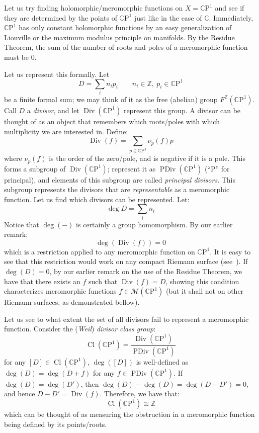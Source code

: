 \documentclass{book}
\newcommand{\Z}{{\mathbb{Z}}}
\newcommand{\C}{{\mathbb{C}}}
\newcommand{\CM}{{\mathcal{M}}}
\newcommand{\CP}{{\mathbb{C}\mathrm{P}}}
\newcommand{\Div}{{\operatorname{Div}}}
\newcommand{\PDiv}{{\operatorname{PDiv}}}
\renewcommand{\deg}{{\operatorname{deg}}}
\renewcommand{\div}{{\operatorname{Div}}}
\newcommand{\Cl}{{\operatorname{Cl}}}
\begin{document}
Let us try finding holomorphic/meromorphic functions on $X = \CP^1$ and see if they are
determined by the points of $\CP^1$ just like in the case of $\C$. Immediately, $\CP^1$ has only constant holomorphic functions by an easy
generalization of Liouville or the maximum modulus principle on manifolds. By the Residue Theorem, the sum of
the number of roots and poles of a meromorphic function must be $0$.

Let us represent this formally. Let
\[
  D = \sum_i n_ip_i \qquad n_i\in \Z,\ p_i \in \CP^1
\]
be a finite formal sum; we may think of it as the free (abelian) group $F^{\Z}(\CP^1)$. Call $D$
a \emph{divisor}, and let $\Div(\CP^1)$
represent this group. A divisor can be thought of as an object that remembers which roots/poles with which
multiplicity we are interested in. Define:
\[
  \div(f) =  \sum_{p \in \CP^1} \nu_{p}(f)p
\]
where $\nu_{p}(f)$ is the order of the zero/pole, and is negative if it is a pole. This forms a subgroup of
$\Div(\CP^1)$; represent it as $\PDiv(\CP^1)$ (``P'' for principal), and elements of this subgroup are called
\emph{principal divisors}. This subgroup represents the divisors that are \emph{representable} as a
meromorphic function. Let us find which divisors can be represented. Let:
\[
  \deg D = \sum_i n_i
\]
Notice that $\deg(-)$ is certainly a group homomorphism. By our earlier remark:
\[
  \deg(\div(f)) = 0
\]
which is a restriction applied to any meromorphic function on $\CP^1$. It is easy to see that this restriction
would work on any compact Riemann surface (see~\cite[chapter~6]{NateComplexAnalysis}). If $\deg(D) = 0$, by
our earlier remark on the use of the Residue Theorem, we have that there exists an $f$ such that $\div(f) = D$,
showing this condition characterizes meromorphic functions $f \in \CM(\CP^1)$ (but it shall not on other
Riemann surfaces, as demonstrated bellow).

Let us see to what extent the set of all divisors fail to represent a meromorphic function. Consider the
(\emph{Weil})\emph{ divisor class group}:
\[
  \Cl(\CP^1) = \frac{\Div(\CP^1)}{\PDiv(\CP^1)}
\]
for any $[D] \in \Cl(\CP^1)$, $\deg([D])$ is well-defined as $\deg(D) = \deg(D + f)$ for any $f \in
\PDiv(\CP^1)$. If $\deg(D) = \deg(D')$, then $\deg(D) - \deg(D) = \deg(D-D') = 0$, and hence $D-D'
= \div(f)$. Therefore, we have that:
\[
  \Cl(\CP^1) \cong \Z
\]
which can be thought of as measuring the obstruction in a meromorphic function being defined by its
points/roots.
\end{document}
